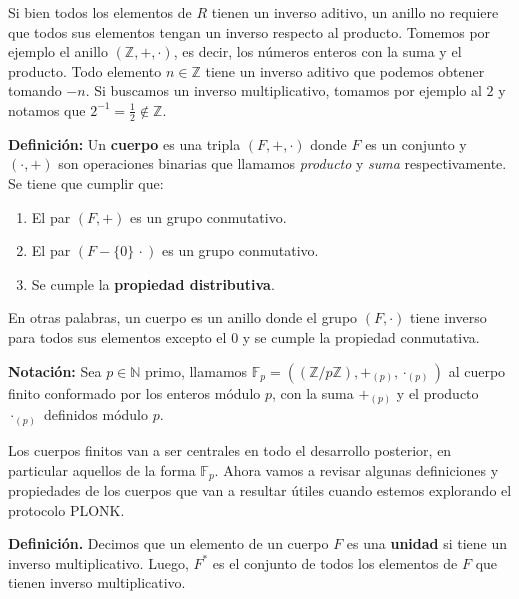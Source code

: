 \vspace{1em}

Si bien todos los elementos de $R$ tienen un inverso aditivo, un anillo no requiere que todos sus elementos tengan un inverso respecto al producto. Tomemos por ejemplo el anillo $(\mathbb{Z}, +, \cdot)$, es decir, los números enteros con la suma y el producto. Todo elemento $n \in \mathbb{Z}$ tiene un inverso aditivo que podemos obtener tomando $-n$. Si buscamos un inverso multiplicativo, tomamos por ejemplo al $2$ y notamos que $2^{-1}=\frac{1}{2} \notin \mathbb{Z}$.

\vspace{2em}

\textbf{Definición:} Un \textbf{cuerpo} es una tripla $(F, +, \cdot)$ donde $F$ es un conjunto y $(\cdot, +)$ son operaciones binarias que llamamos \textit{producto} y \textit{suma} respectivamente. Se tiene que cumplir que:

\begin{enumerate}
    \item El par $(F,+)$ es un grupo conmutativo.
    \item El par $(F-\{0\}\, \cdot)$ es un grupo conmutativo.
    \item Se cumple la \textbf{propiedad distributiva}.
\end{enumerate}

En otras palabras, un cuerpo es un anillo donde el grupo $(F,\cdot)$ tiene inverso para todos sus elementos excepto el $0$ y se cumple la propiedad conmutativa.

\newcommand{\Fp}{\mathbb{F}_p}

\vspace{1em}

\textbf{Notación:} Sea $p \in \mathbb{N}$ primo, llamamos $\Fp = \left((\mathbb{Z}/p\mathbb{Z}), +_{(p)}, \cdot_{(p)}\right)$ al cuerpo finito conformado por los enteros módulo $p$, con la suma $+_{(p)}$ y el producto $\cdot_{(p)}$ definidos módulo $p$.

\vspace{1em}

Los cuerpos finitos van a ser centrales en todo el desarrollo posterior, en particular aquellos de la forma $\Fp$. Ahora vamos a revisar algunas definiciones y propiedades de los cuerpos que van a resultar útiles cuando estemos explorando el protocolo PLONK. 

\vspace{1em}

\textbf{Definición.} Decimos que un elemento de un cuerpo $F$ es una \textbf{unidad} si tiene un inverso multiplicativo. Luego, $F^*$ es el conjunto de todos los elementos de $F$ que tienen inverso multiplicativo.

